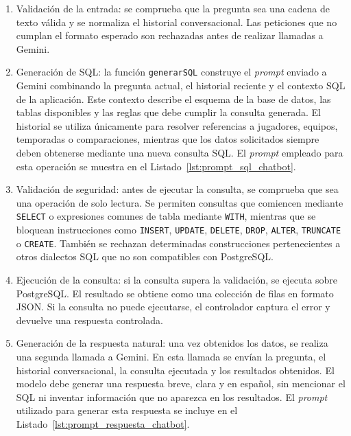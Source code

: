 \begin{enumerate}
    \item Validación de la entrada: se comprueba que la pregunta sea una cadena de texto válida y se normaliza el historial conversacional. Las peticiones que no cumplan el formato esperado son rechazadas antes de realizar llamadas a Gemini.

    \item Generación de SQL: la función \texttt{generarSQL} construye el \textit{prompt} enviado a Gemini combinando la pregunta actual, el historial reciente y el contexto SQL de la aplicación. Este contexto describe el esquema de la base de datos, las tablas disponibles y las reglas que debe cumplir la consulta generada. El historial se utiliza únicamente para resolver referencias a jugadores, equipos, temporadas o comparaciones, mientras que los datos solicitados siempre deben obtenerse mediante una nueva consulta SQL. El \textit{prompt} empleado para esta operación se muestra en el Listado~\ref{lst:prompt_sql_chatbot}.

    \item Validación de seguridad: antes de ejecutar la consulta, se comprueba que sea una operación de solo lectura. Se permiten consultas que comiencen mediante \texttt{SELECT} o expresiones comunes de tabla mediante \texttt{WITH}, mientras que se bloquean instrucciones como \texttt{INSERT}, \texttt{UPDATE}, \texttt{DELETE}, \texttt{DROP}, \texttt{ALTER}, \texttt{TRUNCATE} o \texttt{CREATE}. También se rechazan determinadas construcciones pertenecientes a otros dialectos SQL que no son compatibles con PostgreSQL.

    \item Ejecución de la consulta: si la consulta supera la validación, se ejecuta sobre PostgreSQL. El resultado se obtiene como una colección de filas en formato JSON. Si la consulta no puede ejecutarse, el controlador captura el error y devuelve una respuesta controlada.

    \item Generación de la respuesta natural: una vez obtenidos los datos, se realiza una segunda llamada a Gemini. En esta llamada se envían la pregunta, el historial conversacional, la consulta ejecutada y los resultados obtenidos. El modelo debe generar una respuesta breve, clara y en español, sin mencionar el SQL ni inventar información que no aparezca en los resultados. El \textit{prompt} utilizado para generar esta respuesta se incluye en el Listado~\ref{lst:prompt_respuesta_chatbot}.
\end{enumerate}

